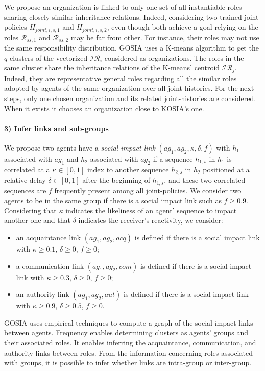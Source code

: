 \documentclass[runningheads]{llncs}
\newcounter{relation}
\begin{document}
We propose an organization is linked to only one set of all instantiable roles sharing closely similar inheritance relations. Indeed, considering two trained joint-policies $H_{joint,i,s,1}$ and $H_{joint,i,s,2}$, even though both achieve a goal relying on the roles $\mathcal{R}_{ss,1}$ and $\mathcal{R}_{ss,2}$ may be far from other. For instance, their roles may not use the same responsibility distribution.
GOSIA uses a K-means algorithm to get the $q$ clusters of the vectorized $\mathcal{IR}_{i}$ considered as organizations. The roles in the same cluster share the inheritance relations of the K-means' centroid $\mathcal{IR}_j$. Indeed, they are representative general roles regarding all the similar roles adopted by agents of the same organization over all joint-histories.
For the next steps, only one chosen organization and its related joint-histories are considered. When it exists it chooses an organization close to KOSIA's one.

\paragraph{3) Infer links and sub-groups}

We propose two agents have a \emph{social impact link} $(ag_1,ag_2, \kappa, \delta, f)$ with $h_1$ associated with $ag_1$ and $h_2$ associated with $ag_2$ if a sequence $h_{1,s}$ in $h_1$ is correlated at a $\kappa \in [0,1]$ index to another sequence $h_{2,s}$ in $h_2$ positioned at a relative delay $\delta \in [0,1]$ after the beginning of $h_{1,s}$, and these two correlated sequences are $f$ frequently present among all joint-policies.
We consider two agents to be in the same group if there is a social impact link such as $f \geq 0.9$. Considering that $\kappa$ indicates the likeliness of an agent' sequence to impact another one and that $\delta$ indicates the receiver's reactivity, we consider:
\begin{itemize}
    \item an acquaintance link $(ag_1,ag_2,acq)$ is defined if there is a social impact link with $\kappa \geq 0.1$, $\delta \geq 0$, $f \geq 0$;
    \item a communication link $(ag_1,ag_2,com)$ is defined if there is a social impact link with $\kappa \geq 0.3$, $\delta \geq 0$, $f \geq 0$;
    \item an authority link $(ag_1,ag_2,aut)$ is defined if there is a social impact link with $\kappa \geq 0.9$, $\delta \geq 0.5$, $f \geq 0$.
\end{itemize}
GOSIA uses empirical techniques to compute a graph of the social impact links between agents. Frequency enables determining clusters as agents' groups and their associated roles. It enables inferring the acquaintance, communication, and authority links between roles. From the information concerning roles associated with groups, it is possible to infer whether links are intra-group or inter-group.
\end{document}

